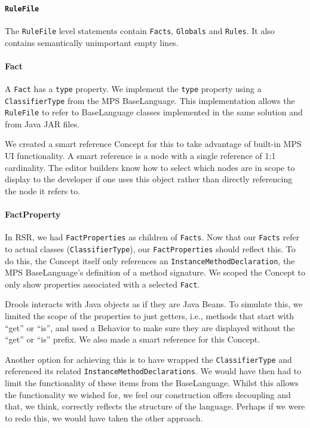 \paragraph{\texttt{RuleFile}} The \texttt{RuleFile} level statements contain \texttt{Facts}, \texttt{Globals} and \texttt{Rules}.
It also contains semantically unimportant empty lines.

\paragraph{Fact} A \texttt{Fact} has a \texttt{type} property.
We implement the \texttt{type} property using a \texttt{ClassifierType} from the MPS BaseLanguage.
This implementation allows the \texttt{RuleFile} to refer to BaseLanguage classes implemented in the same solution and from Java JAR files.

We created a smart reference Concept for this to take advantage of built-in MPS UI functionality.
A smart reference is a node with a single reference of 1:1 cardinality.
The editor builders know how to select which nodes are in scope to display to the developer if one uses this object rather than directly referencing the node it refers to.

\paragraph{FactProperty} In RSR, we had \texttt{FactProperties} as children of \texttt{Facts}.
Now that our \texttt{Facts} refer to actual classes (\texttt{ClassifierType}), our \texttt{FactProperties} should reflect this.
To do this, the Concept itself only references an \texttt{InstanceMethodDeclaration}, the MPS BaseLanguage's definition of a method signature.
We scoped the Concept to only show properties associated with a selected \texttt{Fact}.

Drools interacts with Java objects as if they are Java Beans.
To simulate this, we limited the scope of the properties to just getters, i.e., methods that start with ``get'' or ``is'', and used a Behavior to make sure they are displayed without the ``get'' or ``is'' prefix.
We also made a smart reference for this Concept.

Another option for achieving this is to have wrapped the \texttt{ClassifierType} and referenced its related \texttt{InstanceMethodDeclarations}.
We would have then had to limit the functionality of these items from the BaseLanguage.
Whilst this allows the functionality we wished for, we feel our construction offers decoupling and that, we think, correctly reflects the structure of the language.
Perhaps if we were to redo this, we would have taken the other approach.

